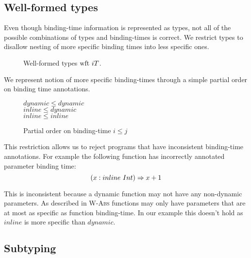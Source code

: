 \subsection{Well-formed types}

Even though binding-time information is represented as types, not all
of the possible combinations of types and binding-times is correct.
We restrict types to disallow nesting of more specific binding times
into less specific ones.

\begin{figure}[H]

  {}

  {}

  {}
\caption{Well-formed types $\text{wft}\ i T$.}
\end{figure}

We represent notion of more specific binding-times through
a simple partial order on binding time annotations.

\begin{figure}[H]
  \begin{center}
  $ dynamic \leq dynamic $ \\
  $ inline  \leq dynamic $ \\
  $ inline  \leq inline  $
  \end{center}
\caption{Partial order on binding-time $i \leq j$}
\end{figure}

This restriction allows us to reject programs that have inconsistent binding-time annotations.
For example the following function has incorrectly annotated parameter binding time:
\begin{equation}\nonumber
    (x: inline\ Int) \Rightarrow x + 1
\end{equation}

This is inconsistent because a dynamic function may not have any non-dynamic parameters.
As described in \textsc{W-Abs} functions may only have parameters that are at most as specific
as function binding-time. In our example this doesn't hold as $inline$ is more
specific than $dynamic$.

\subsection{Subtyping}

